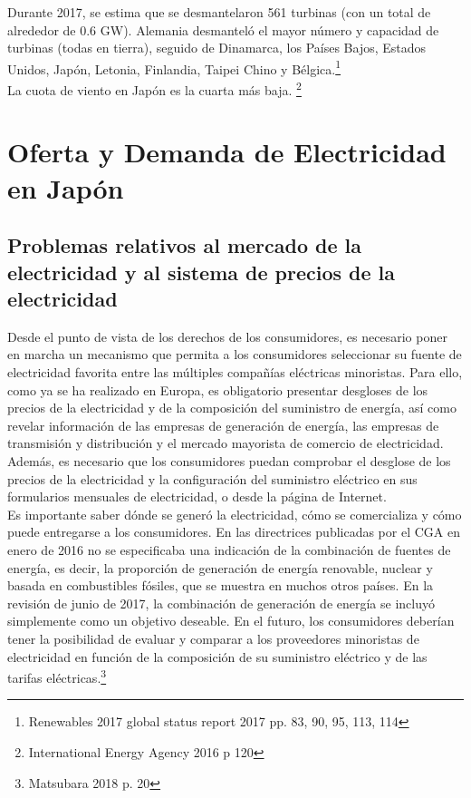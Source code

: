 \documentclass[]{article}
\begin{document}
Durante 2017, se estima que se desmantelaron 561 turbinas (con un total de alrededor de 0.6 GW).
Alemania desmanteló el
mayor número y capacidad de turbinas (todas en tierra), seguido de Dinamarca, los Países Bajos, Estados Unidos, Japón, Letonia, Finlandia, Taipei Chino y Bélgica.\citep{Renewables2017globalstatusreport2017}\footnote{Renewables 2017 global status report 2017 pp. 83, 90, 95, 113, 114}\\


La cuota de viento en Japón es la cuarta más baja. \citep{InternationalEnergyAgency2016}\footnote{International Energy Agency 2016 p 120}\\

\section{Oferta y Demanda de Electricidad en Japón}

\subsection{Problemas relativos al mercado de la electricidad y al sistema de precios de la electricidad
}

Desde el punto de vista de los derechos de los consumidores, es necesario poner en marcha un mecanismo que permita a los consumidores seleccionar su fuente de electricidad favorita entre las múltiples compañías eléctricas minoristas. Para ello, como ya se ha realizado en Europa, es obligatorio presentar desgloses de los precios de la electricidad y de la composición del suministro de energía, así como revelar información de las empresas de generación de energía, las empresas de transmisión y distribución y el mercado mayorista de comercio de electricidad. Además, es necesario que los consumidores puedan comprobar el desglose de los precios de la electricidad y la configuración del suministro eléctrico en sus formularios mensuales de electricidad, o desde la página de Internet.\\

Es importante saber dónde se generó la electricidad, cómo se comercializa y cómo puede entregarse a los consumidores. En las directrices publicadas por el CGA en enero de 2016 no se especificaba una indicación de la combinación de fuentes de energía, es decir, la proporción de generación de energía renovable, nuclear y basada en combustibles fósiles, que se muestra en muchos otros países. En la revisión de junio de 2017, la combinación de generación de energía se incluyó simplemente como un objetivo deseable. En el futuro, los consumidores deberían tener la posibilidad de evaluar y comparar a los proveedores minoristas de electricidad en función de la composición de su suministro eléctrico y de las tarifas eléctricas.\citep{Matsubara2018}\footnote{Matsubara 2018 p. 20}\\
\end{document}
